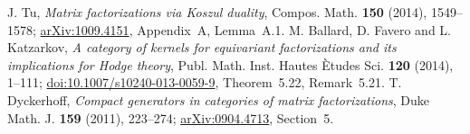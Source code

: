J. Tu, \emph{Matrix factorizations via Koszul duality},
Compos. Math. \textbf{150} (2014), 1549--1578;
\href{https://arxiv.org/abs/1009.4151}{arXiv:1009.4151}, Appendix~A, Lemma~A.1.
M. Ballard, D. Favero and L. Katzarkov,
\emph{A category of kernels for equivariant factorizations and its implications for Hodge theory},
Publ. Math. Inst. Hautes \`Etudes Sci. \textbf{120} (2014), 1--111;
\href{https://doi.org/10.1007/s10240-013-0059-9}{doi:10.1007/s10240-013-0059-9},
Theorem~5.22, Remark~5.21.
T. Dyckerhoff, \emph{Compact generators in categories of matrix factorizations},
Duke Math. J. \textbf{159} (2011), 223--274;
\href{https://arxiv.org/abs/0904.4713}{arXiv:0904.4713}, Section~5.
